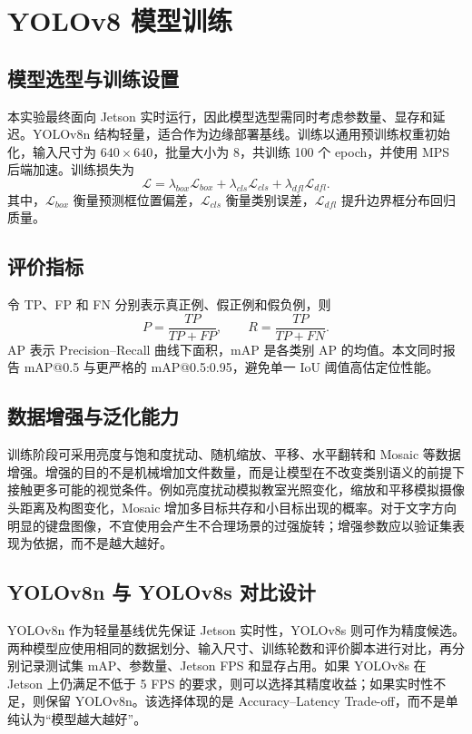 \documentclass[UTF8,fontset=none,a4paper,11pt]{ctexart}
\begin{document}
\section{YOLOv8 模型训练}
\subsection{模型选型与训练设置}
本实验最终面向 Jetson 实时运行，因此模型选型需同时考虑参数量、显存和延迟。YOLOv8n 结构轻量，适合作为边缘部署基线。训练以通用预训练权重初始化，输入尺寸为 $640\times640$，批量大小为 8，共训练 100 个 epoch，并使用 MPS 后端加速。训练损失为
\begin{equation}\mathcal{L}=\lambda_{box}\mathcal{L}_{box}+\lambda_{cls}\mathcal{L}_{cls}+\lambda_{dfl}\mathcal{L}_{dfl}.\end{equation}
其中，$\mathcal{L}_{box}$ 衡量预测框位置偏差，$\mathcal{L}_{cls}$ 衡量类别误差，$\mathcal{L}_{dfl}$ 提升边界框分布回归质量。
\subsection{评价指标}
令 TP、FP 和 FN 分别表示真正例、假正例和假负例，则
\begin{equation}P=\frac{TP}{TP+FP},\qquad R=\frac{TP}{TP+FN}.\end{equation}
AP 表示 Precision--Recall 曲线下面积，mAP 是各类别 AP 的均值。本文同时报告 mAP@0.5 与更严格的 mAP@0.5:0.95，避免单一 IoU 阈值高估定位性能。

\subsection{数据增强与泛化能力}
训练阶段可采用亮度与饱和度扰动、随机缩放、平移、水平翻转和 Mosaic 等数据增强。增强的目的不是机械增加文件数量，而是让模型在不改变类别语义的前提下接触更多可能的视觉条件。例如亮度扰动模拟教室光照变化，缩放和平移模拟摄像头距离及构图变化，Mosaic 增加多目标共存和小目标出现的概率。对于文字方向明显的键盘图像，不宜使用会产生不合理场景的过强旋转；增强参数应以验证集表现为依据，而不是越大越好。

\subsection{YOLOv8n 与 YOLOv8s 对比设计}
YOLOv8n 作为轻量基线优先保证 Jetson 实时性，YOLOv8s 则可作为精度候选。两种模型应使用相同的数据划分、输入尺寸、训练轮数和评价脚本进行对比，再分别记录测试集 mAP、参数量、Jetson FPS 和显存占用。如果 YOLOv8s 在 Jetson 上仍满足不低于 5 FPS 的要求，则可以选择其精度收益；如果实时性不足，则保留 YOLOv8n。该选择体现的是 Accuracy--Latency Trade-off，而不是单纯认为“模型越大越好”。
\end{document}
